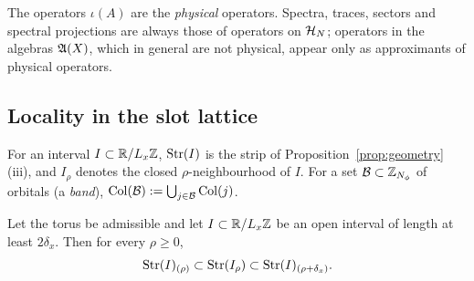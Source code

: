 The operators $\iota(A)$ are the \emph{physical} operators. Spectra, traces, sectors and spectral projections
are always those of operators on $\mathcal{H}_N$; operators in the algebras $\mathfrak{A}(X)$, which in general are not
physical, appear only as approximants of physical operators.

\subsection{Locality in the slot lattice}

\begin{definition}\label{def:strips}
For an interval $I\subset\mathbb{R}/L_x\mathbb{Z}$, $\mathrm{Str}(I)$ is the strip of Proposition~\ref{prop:geometry}(iii), and $I_\rho$
denotes the closed $\rho$-neighbourhood of $I$. For a set $\mathcal B\subset\mathbb{Z}_{N_{\phi}}$ of orbitals (a \emph{band}),
$\mathrm{Col}(\mathcal B):=\bigcup_{j\in\mathcal B}\mathrm{Col}(j)$.
\end{definition}

\begin{lemma}\label{lem:strips}
Let the torus be admissible and let $I\subset\mathbb{R}/L_x\mathbb{Z}$ be an open interval of length at least $2\delta_x$. Then for
every $\rho\ge0$,
\[
\mathrm{Str}(I)_{(\rho)}\subset\mathrm{Str}(I_\rho)\subset\mathrm{Str}(I)_{(\rho+\delta_x)}.
\]
\end{lemma}

